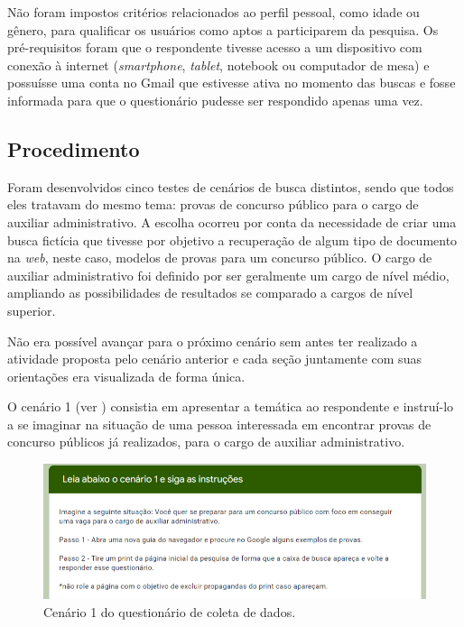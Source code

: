 \documentclass[portuguese]{textolivre}
\begin{document}
Não foram impostos critérios relacionados ao perfil pessoal, como idade ou gênero, para qualificar os usuários como aptos a participarem da pesquisa. Os pré-requisitos foram que o respondente tivesse acesso a um dispositivo com conexão à internet (\textit{smartphone}, \textit{tablet}, notebook ou computador de mesa) e possuísse uma conta no Gmail que estivesse ativa no momento das buscas e fosse informada para que o questionário pudesse ser respondido apenas uma vez.

\subsection{Procedimento}\label{sec-organizacao}
Foram desenvolvidos cinco testes de cenários de busca distintos, sendo que todos eles tratavam do mesmo tema: provas de concurso público para o cargo de auxiliar administrativo. A escolha ocorreu por conta da necessidade de criar uma busca fictícia que tivesse por objetivo a recuperação de algum tipo de documento na \textit{web}, neste caso, modelos de provas para um concurso público. O cargo de auxiliar administrativo foi definido por ser geralmente um cargo de nível médio, ampliando as possibilidades de resultados se comparado a cargos de nível superior.

Não era possível avançar para o próximo cenário sem antes ter realizado a atividade proposta pelo cenário anterior e cada seção juntamente com suas orientações era visualizada de forma única.

O cenário 1 (ver ) consistia em apresentar a temática ao respondente e instruí-lo a se imaginar na situação de uma pessoa interessada em encontrar provas de concurso públicos já realizados, para o cargo de auxiliar administrativo.

\begin{figure}[h!]
    \centering
    \includegraphics[width=0.8\linewidth]{fig-003.png}
    \caption{Cenário 1 do questionário de coleta de dados.}
    \label{fig3}
\end{figure}
\end{document}
